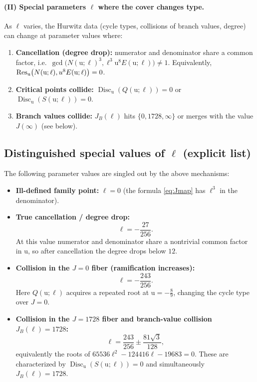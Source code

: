 \documentclass[11pt, a4paper]{article}
\newcommand{\ur}{\mathrm{u}}
\DeclareMathOperator{\Disc}{Disc} %
\numberwithin{equation}{section}
\begin{document}
\paragraph{(II) Special parameters $\ell$ where the cover changes type.}
As $\ell$ varies, the Hurwitz data (cycle types, collisions of branch values, degree)
can change at parameter values where:
\begin{enumerate}
\item \textbf{Cancellation (degree drop):} numerator and denominator share a common factor,
i.e.\ $\gcd\bigl(N(\ur;\ell)^3,\ell^3\ur^8E(\ur;\ell)\bigr)\neq 1$.
Equivalently, $\Res_\ur\bigl(N(\ur;\ell),u^8E(\ur;\ell)\bigr)=0$.
\item \textbf{Critical points collide:} $\Disc_\ur(Q(\ur;\ell))=0$ or $\Disc_\ur(S(\ur;\ell))=0$.
\item \textbf{Branch values collide:} $J_B(\ell)$ hits $\{0,1728,\infty\}$ or merges with
the value $J(\infty)$ (see below).
\end{enumerate}

\subsection{Distinguished special values of \texorpdfstring{$\ell$}{el} (explicit list)}
The following parameter values are singled out by the above mechanisms:
\begin{itemize}
\item \textbf{Ill-defined family point:} $\ell=0$ (the formula \eqref{eq:Jmap} has $\ell^3$
in the denominator).
\item \textbf{True cancellation / degree drop:}
\begin{equation}
\label{eq:ell-cancel}
\ell=-\frac{27}{256}.
\end{equation}
At this value numerator and denominator share a nontrivial common factor in $\ur$, so after
cancellation the degree drops below $12$.
\item \textbf{Collision in the $J=0$ fiber (ramification increases):}
\begin{equation}
\label{eq:ell-Qdisc}
\ell=-\frac{243}{256}.
\end{equation}
Here $Q(\ur;\ell)$ acquires a repeated root at $\ur=-\frac{8}{9}$, changing the cycle type
over $J=0$.
\item \textbf{Collision in the $J=1728$ fiber and branch-value collision $J_B(\ell)=1728$:}
\begin{equation}
\label{eq:ell-Sdisc}
\ell=\frac{243}{256}\pm\frac{81\sqrt{3}}{128},
\end{equation}
equivalently the roots of
\(
65536\ell^2-124416\ell-19683=0.
\)
These are characterized by $\Disc_\ur(S(\ur;\ell))=0$ and simultaneously $J_B(\ell)=1728$.
\end{itemize}
\end{document}
